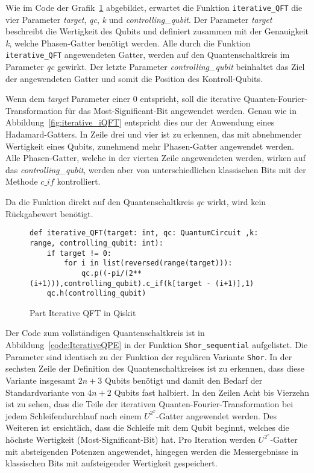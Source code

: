 Wie im Code der Grafik~\ref{code:iterativeQFT} abgebildet, 
erwartet die Funktion \texttt{iterative\_QFT} die vier Parameter \textit{target}, \textit{qc}, \textit{k} und \textit{controlling\_qubit}.
Der Parameter \textit{target} beschreibt die Wertigkeit des Qubits und 
definiert zusammen mit der Genauigkeit \textit{k}, 
welche Phasen-Gatter benötigt werden.
Alle durch die Funktion \texttt{iterative\_QFT} angewendeten Gatter, 
werden auf den Quantenschaltkreis im Parameter \textit{qc} gewirkt.
Der letzte Parameter \textit{controlling\_qubit} beinhaltet das Ziel der angewendeten Gatter und 
somit die Position des Kontroll-Qubits.

Wenn dem \textit{target} Parameter einer 0 entspricht, 
soll die iterative Quanten-Fourier-Transformation für das Most-Significant-Bit angewendet werden.
Genau wie in Abbildung~\ref{fig:iterative_iQFT} entspricht dies nur der Anwendung eines Hadamard-Gatters.
In Zeile drei und vier ist zu erkennen, 
das mit abnehmender Wertigkeit eines Qubits, zunehmend mehr Phasen-Gatter angewendet werden.
Alle Phasen-Gatter, welche in der vierten Zeile angewendeten werden, 
wirken auf das \textit{controlling\_qubit}, 
werden aber von unterschiedlichen klassischen Bits mit der Methode \(c\_if\) kontrolliert.

Da die Funktion direkt auf den Quantenschaltkreis \textit{qc} wirkt, 
wird kein Rückgabewert benötigt.
\begin{figure}[H]
  \caption{Part Iterative QFT in Qiskit}
  \label{code:iterativeQFT}
\begin{verbatim}    
def iterative_QFT(target: int, qc: QuantumCircuit ,k: range, controlling_qubit: int):
    if target != 0:
        for i in list(reversed(range(target))):
            qc.p((-pi/(2**(i+1))),controlling_qubit).c_if(k[target - (i+1)],1)
    qc.h(controlling_qubit)
  \end{verbatim}
\end{figure}

Der Code zum vollständigen Quantenschaltkreis ist in Abbildung~\ref{code:IterativeQPE} in der Funktion \texttt{Shor\_sequential} aufgelistet.
Die Parameter sind identisch zu der Funktion der regulären Variante \texttt{Shor}.
In der sechsten Zeile der Definition des Quantenschaltkreises ist zu erkennen,
dass diese Variante insgesamt \(2n+3\) Qubits benötigt und damit den Bedarf der Standardvariante von \(4n+2\) Qubits fast halbiert.
In den Zeilen Acht bis Vierzehn ist zu sehen, 
dass die Teile der iterativen Quanten-Fourier-Transformation bei jedem Schleifendurchlauf nach einem \(U^{2^x}\)-Gatter angewendet werden. 
Des Weiteren ist ersichtlich, 
dass die Schleife mit dem Qubit beginnt, 
welches die höchste Wertigkeit (Most-Significant-Bit) hat.
Pro Iteration werden \(U^{2^x}\)-Gatter mit absteigenden Potenzen angewendet, 
hingegen werden die Messergebnisse in klassischen Bits mit aufsteigender Wertigkeit gespeichert.

